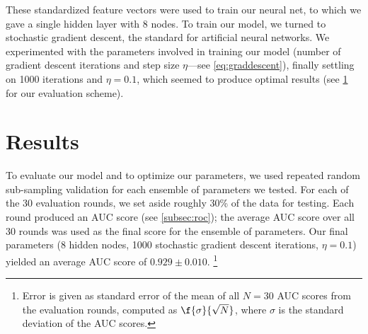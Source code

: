 \documentclass[10pt]{article}
\begin{document}
These standardized feature vectors were used to train our neural net, to which we gave a single hidden layer with 8 nodes.
To train our model, we turned to stochastic gradient descent, the standard for artificial neural networks.
We experimented with the parameters involved in training our model (number of gradient descent iterations and step size $\eta$---see \cref{eq:graddescent}), finally settling on 1000 iterations and $\eta = 0.1$, which seemed to produce optimal results (see \cref{sec:results} for our evaluation scheme).

\section{Results}
\label{sec:results}

To evaluate our model and to optimize our parameters, we used repeated random sub-sampling validation for each ensemble of parameters we tested. For each of the 30 evaluation rounds, we set aside roughly 30\% of the data for testing. Each round produced an AUC score (see \cref{subsec:roc}); the average AUC score over all 30 rounds was used as the final score for the ensemble of parameters. Our final parameters (8 hidden nodes, 1000 stochastic gradient descent iterations, $\eta = 0.1$) yielded an average AUC score of $0.929 \pm 0.010$. \footnote{Error is given as standard error of the mean of all $N = 30$ AUC scores from the evaluation rounds, computed as $\f{\sigma}{\sqrt{N}}$, where $\sigma$ is the standard deviation of the AUC scores.}
\end{document}
